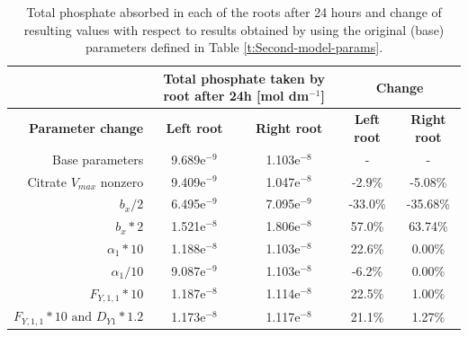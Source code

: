 \documentclass[11pt]{article}
\begin{document}
\begin{table}[h]
\begin{center}

\fontsize{9.5}{7}\selectfont
\setlength{\tabcolsep}{5.pt}
\def\arraystretch{2.0}
\begin{tabular}{rcccc}
\toprule
 & \multicolumn{2}{c}{\textbf{Total phosphate taken by root after 24h [mol dm$^{-1}$]}} & \multicolumn{2}{c}{\textbf{Change}} \\
 \hline
  \textbf{Parameter change} & \textbf{Left root} & \textbf{Right root} & \textbf{Left root}  & \textbf{Right root}\\
 \hline 
Base parameters & 9.689e$^{-9}$ &  1.103e$^{-8}$& - &- \\
Citrate $V_{max}$ nonzero     & 9.409e$^{-9}$ & 1.047e$^{-8}$ & -2.9\% & -5.08\%\\
$b_x / 2$                     & 6.495e$^{-9}$ & 7.095e$^{-9}$ & -33.0\% & -35.68\%\\
$b_x * 2$                     & 1.521e$^{-8}$ & 1.806e$^{-8}$ & 57.0\% & 63.74\% \\
$\alpha_1 * 10$                & 1.188e$^{-8}$ & 1.103e$^{-8}$ & 22.6\% & 0.00\% \\
$\alpha_1 / 10$                & 9.087e$^{-9}$ & 1.103e$^{-8}$ & -6.2\% & 0.00\% \\
$F_{Y,1,1}*10$                & 1.187e$^{-8}$ & 1.114e$^{-8}$ & 22.5\% & 1.00\% \\
$F_{Y,1,1}*10\text{ and } D_{Y1}*1.2$ & 1.173e$^{-8}$ & 1.117e$^{-8}$ & 21.1\% & 1.27\%   \\
\bottomrule
\end{tabular}
\caption{Total phosphate absorbed in each of the roots after 24 hours and change of resulting values with respect to results obtained by using the original (base) parameters defined in Table \ref{t:Second-model-params}.}
\end{center}
\end{table}

\newpage
\clearpage

















\end{document}

